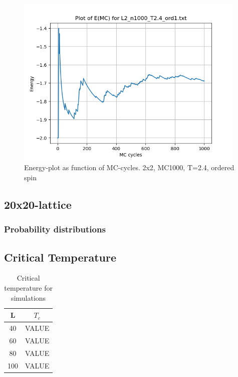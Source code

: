 \documentclass{article}
\begin{document}
\begin{figure}[ht]
    \centering
    \includegraphics[width = 11cm]{img/energy_L2_n1000_T24_ord1.png}
    \caption{Energy-plot as function of MC-cycles. 2x2, MC1000, T=2.4, ordered spin}
    \label{fig:energy_L2_n1000_T2.4_ord1}
  \end{figure}

\subsection{20x20-lattice}

\subsubsection{Probability distributions}


\subsection{Critical Temperature}

  \begin{table}[ht]
    \centering
    \caption{Critical temperature for simulations}
    \vspace{2mm}
    \label{tab:criticaltemperature}
    \begin{tabular}{|c|c|}
        \hline
         L & $T_c$\\
        \hline \hline
        40 & VALUE \\
        60 & VALUE \\
        80 & VALUE \\
        100 & VALUE \\
        \hline
    \end{tabular} \\
    \hspace{0pt}\\
  \end{table}
\end{document}
